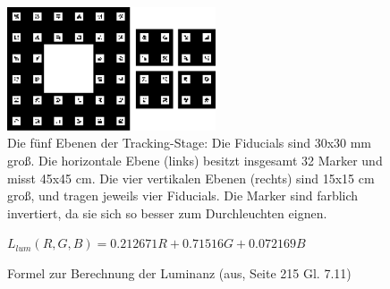 \begin{figure}[H]
   \centering
   \includegraphics[width=0.55\textwidth]{../graphics/position/stage_fiducials.svg}
    \caption[Fiducials der Tracking-Stage]{Die fünf Ebenen der Tracking-Stage: Die Fiducials sind 30x30 mm groß. Die horizontale Ebene (links) besitzt insgesamt 32 Marker und misst 45x45 cm. Die vier vertikalen Ebenen (rechts) sind 15x15 cm groß, und tragen jeweils vier Fiducials. Die Marker sind farblich invertiert, da sie sich so besser zum Durchleuchten eignen.}
   \label{fig:stage_fiducials}
   \end{figure}

 \begin{figure}[H]
   $   L_{lum}(R,G,B)  = 0.212671 R +  0.71516 G + 0.072169 B $
   \caption[Formel zur Luminanzberechnung]{Formel zur Berechnung der Luminanz (aus\cite{Akenine_2011}, Seite 215 Gl. 7.11) }
  \label{eq:luminance}
 \end{figure}

